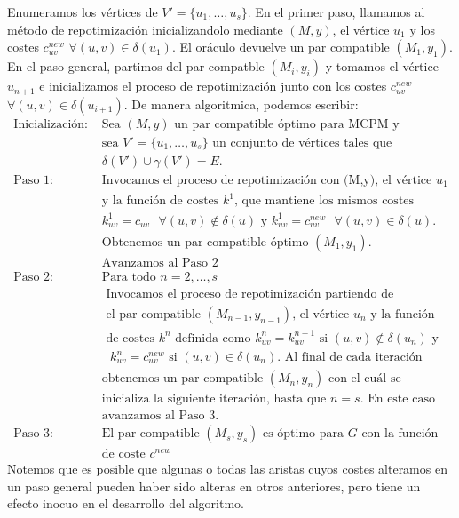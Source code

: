 \documentclass[twoside,a4paper,openright,12pt,tikz]{book}
\begin{document}
Enumeramos los vértices de $V' = \{u_1,\dotsc,u_s\}$. En el primer paso, llamamos al método de repotimización inicializandolo mediante $(M,y)$, el vértice $u_1$ y los costes $c_{uv}^{new}$ $\forall (u,v) \in \delta(u_1)$. El oráculo devuelve un par compatible $(M_1,y_1)$. En el paso general, partimos del par compatble $(M_i,y_i)$ y tomamos el vértice $u_{n+1}$ e inicializamos el proceso de repotimización junto con los costes $c_{uv}^{new}$ $\forall (u,v) \in \delta(u_{i+1})$. 
De manera algoritmica, podemos escribir:
\begin{align*}
\text{Inicialización: }& \text{Sea $(M,y)$ un par compatible óptimo para MCPM y}\\
& \text{sea $V'=\{u_1,\dotsc,u_s\}$ un conjunto de vértices tales que }\\
& \text{$\delta(V')\cup\gamma(V')=E$.}\\
\text{Paso 1: }& \text{Invocamos el proceso de repotimización con (M,y), el vértice $u_1$}\\
&\text{y la función de costes $k^1$, que mantiene los mismos costes}\\
&\text{$k^1_{uv} = c_{uv}$ $\forall (u,v)\notin \delta(u)$ y $k^1_{uv}=c^{new}_{uv}$ $\forall(u,v) \in \delta(u)$.}\\
&\text{Obtenemos un par compatible óptimo $(M_1,y_1)$.}\\
&\text{Avanzamos al Paso 2}\\
\text{Paso 2: }& \text{Para todo $n =2,\dotsc,s$}\\
&\text{		Invocamos el proceso de repotimización partiendo de}\\
&\text{		el par compatible $(M_{n-1},y_{n-1})$, el vértice $u_n$ y la función}\\
&\text{		de costes $k^n$ definida como $k^n_{uv} =k^{n-1}_{uv}$ si $(u,v)\notin \delta(u_n)$ y}\\
&\text{		$k^n_{uv}=c^{new}_{uv}$ si $(u,v)\in \delta(u_n)$. Al final de cada iteración }\\
&\text{obtenemos un par compatible $(M_n,y_n)$ con el cuál se}\\
&\text{inicializa la siguiente iteración, hasta que $n=s$. En este caso}\\
&\text{avanzamos al Paso 3.}\\
\text{Paso 3: }&\text{El par compatible $(M_s,y_s)$ es óptimo para $G$ con la función}\\
&\text{de coste $c^{new}$}
\end{align*}
Notemos que es posible que algunas o todas las aristas cuyos costes alteramos en un paso general pueden haber sido alteras en otros anteriores, pero tiene un efecto inocuo en el desarrollo del algoritmo. 
\end{document}
